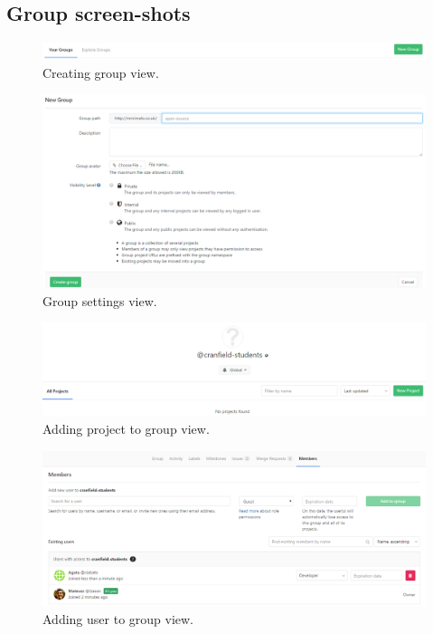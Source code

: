 \begin{appendix}
	\chapter{Group screen-shots}
		\begin{figure}[!htbp]
			\centering
			\includegraphics[width=1\textwidth]{img/ug-groups/new-group1}
			\caption{Creating group view.}
			\label{fig:creating-group-view}
		\end{figure}	
		\begin{figure}[!htbp]
			\centering
			\includegraphics[width=1\textwidth]{img/ug-groups/new-group-settings}
			\caption{Group settings view.}
			\label{fig:group-settings-view}
		\end{figure}
		\begin{figure}[!htbp]
			\centering
			\includegraphics[width=1\textwidth]{img/ug-groups/group-projects}
			\caption{Adding project to group view.}
			\label{fig:adding-project-to-group}
		\end{figure}		
		\begin{figure}[!htbp]
			\centering
			\includegraphics[width=1\textwidth]{img/ug-groups/group-members}
			\caption{Adding user to group view.}
			\label{fig:adding-user-to-group}
		\end{figure}		

\end{appendix}
